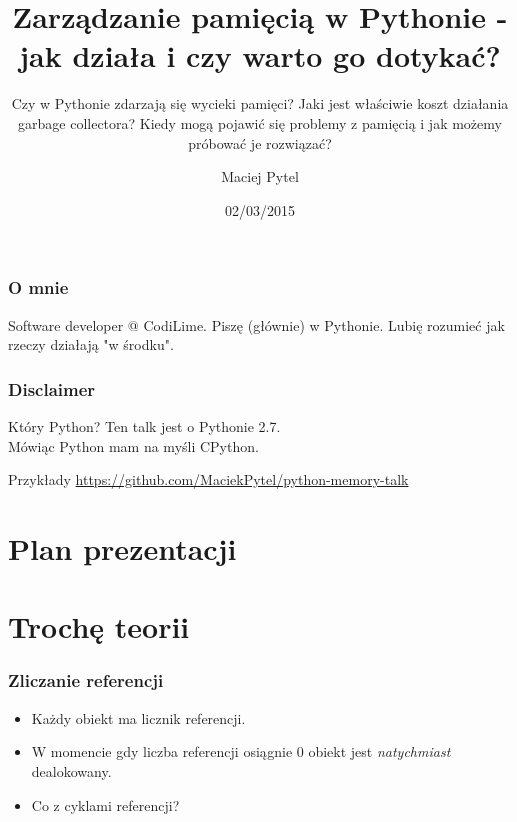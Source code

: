\documentclass{beamer}
\title[Zarządzanie pamięcią w Pythonie]{Zarządzanie pamięcią w Pythonie - jak działa i czy warto go dotykać?}
\subtitle{Czy w Pythonie zdarzają się wycieki pamięci? Jaki jest właściwie koszt działania garbage collectora? Kiedy mogą pojawić się problemy z pamięcią i jak możemy próbować je rozwiązać?}
\author[Maciej Pytel]{Maciej Pytel}
\date{02/03/2015}
\begin{document}

\begin{frame}
  \begin{titlepage}
  \end{titlepage}
\end{frame}

\begin{frame}
    \frametitle{O mnie}
    Software developer @ CodiLime. Piszę (głównie) w Pythonie. Lubię rozumieć jak rzeczy działają "w środku".
\end{frame}

\begin{frame}
    \frametitle{Disclaimer}
    \begin{block}{Który Python?}
        Ten talk jest o Pythonie 2.7.\\
        Mówiąc Python mam na myśli CPython.
    \end{block}
    \begin{block}{Przykłady}
        \url{https://github.com/MaciekPytel/python-memory-talk}
    \end{block}
\end{frame}

\section*{Plan prezentacji}
    \begin{frame}
      \tableofcontents
    \end{frame}

\setcounter{section}{0}
\section{Trochę teorii}
\frame\sectionpage
    \begin{frame}
        \frametitle{Zliczanie referencji}
        \begin{itemize}
            \item Każdy obiekt ma licznik referencji.
            \item W momencie gdy liczba referencji osiągnie 0 obiekt jest \textit{natychmiast} dealokowany.
            \item Co z cyklami referencji?
        \end{itemize}
    \end{frame}
\end{document}
